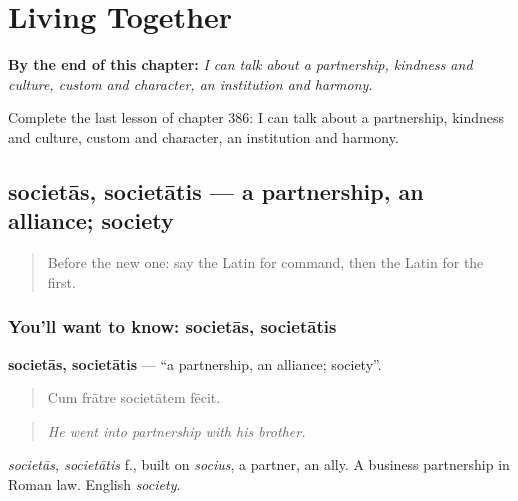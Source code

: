 
\chapter{Living Together}
\label{ch:la-living-together}

\begin{chapteropening}
\textbf{By the end of this chapter:} \emph{I can talk about a partnership, kindness and culture, custom and character, an institution and harmony.}

Complete the last lesson of chapter 386: I can talk about a partnership, kindness and culture, custom and character, an institution and harmony.
\end{chapteropening}

\section[societās, societātis]{societās, societātis — a partnership, an alliance; society}

\label{lesson:LA-C386-societas}



\begin{quote}
Before the new one: say the Latin for command, then the Latin for the first.
\end{quote}

\subsection*{You'll want to know: societās, societātis}
\textbf{societās, societātis} — \textquotedblleft{}a partnership, an alliance; society\textquotedblright{}.

\begin{quote}
Cum frātre societātem fēcit.
\end{quote}

\begin{quote}
\emph{He went into partnership with his brother.}
\end{quote}

\emph{societās, societātis} f., built on \emph{socius}, a partner, an ally. A business partnership in Roman law. English \emph{society}.

